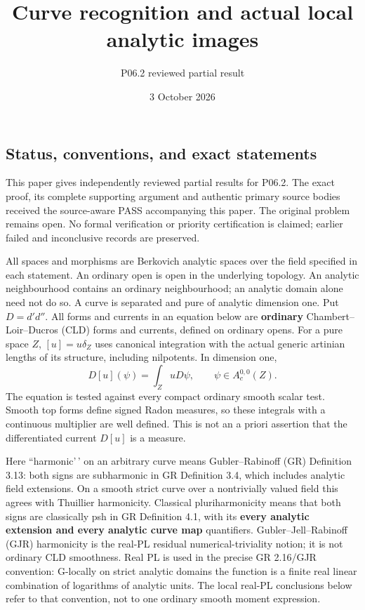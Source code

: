 \documentclass[
  11pt,
]{article}
\title{Curve recognition and actual local analytic images}
\author{P06.2 reviewed partial result}
\date{3 October 2026}
\begin{document}
\maketitle

\subsection{Status, conventions, and exact
statements}\label{status-conventions-and-exact-statements}

This paper gives independently reviewed partial results for P06.2. The
exact proof, its complete supporting argument and authentic primary
source bodies received the source-aware PASS accompanying this paper.
The original problem remains open. No formal verification or priority
certification is claimed; earlier failed and inconclusive records are
preserved.

All spaces and morphisms are Berkovich analytic spaces over the field
specified in each statement. An ordinary open is open in the underlying
topology. An analytic neighbourhood contains an ordinary neighbourhood;
an analytic domain alone need not do so. A curve is separated and pure
of analytic dimension one. Put \(D=d'd''\). All forms and currents in an
equation below are \textbf{ordinary} Chambert--Loir--Ducros (CLD) forms
and currents, defined on ordinary opens. For a pure space \(Z\),
\([u]=u\delta_Z\) uses canonical integration with the actual generic
artinian lengths of its structure, including nilpotents. In dimension
one, \[
                 D[u](\psi)=\int_Z uD\psi,
                 \qquad \psi\in A_c^{0,0}(Z).
\] The equation is tested against every compact ordinary smooth scalar
test. Smooth top forms define signed Radon measures, so these integrals
with a continuous multiplier are well defined. This is not an a priori
assertion that the differentiated current \(D[u]\) is a measure.

Here ``harmonic'\,' on an arbitrary curve means Gubler--Rabinoff (GR)
Definition 3.13: both signs are subharmonic in GR Definition 3.4, which
includes analytic field extensions. On a smooth strict curve over a
nontrivially valued field this agrees with Thuillier harmonicity.
Classical pluriharmonicity means that both signs are classically psh in
GR Definition 4.1, with its \textbf{every analytic extension and every
analytic curve map} quantifiers. Gubler--Jell--Rabinoff (GJR)
harmonicity is the real-PL residual numerical-triviality notion; it is
not ordinary CLD smoothness. Real PL is used in the precise GR 2.16/GJR
convention: G-locally on strict analytic domains the function is a
finite real linear combination of logarithms of analytic units. The
local real-PL conclusions below refer to that convention, not to one
ordinary smooth moment expression.
\end{document}
